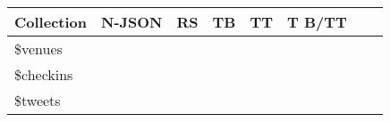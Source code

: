 
  \begin{tabular}{l|rrrrrrr}
    \toprule    
    Collection & N-JSON & RS &TB & TT &T B/TT\\
    \midrule   
    \$venues & \\
     \$checkins & \\
     \$tweets & \\
  \bottomrule
\end{tabular}